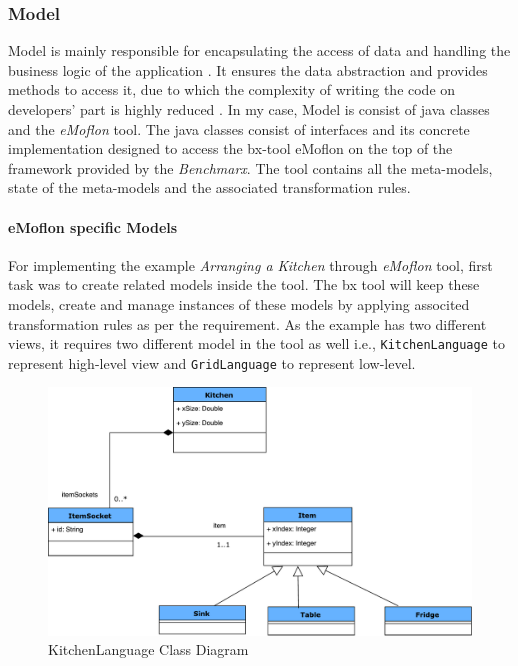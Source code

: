 \subsubsection{Model}\label{subsubsec:design_model}
Model is mainly responsible for encapsulating the access of data and handling the business logic of the application \cite{designpattern-headfirst} \cite{mvc-arch}. It ensures the data abstraction and provides methods to access it, due to which the complexity of writing the code on developers' part is highly reduced \cite{mdd-webwithmvc}.
\newline\newline In my case, Model is consist of java classes and the \textit{eMoflon} tool. The java classes consist of interfaces and its concrete implementation designed to access the bx-tool eMoflon on the top of the framework provided by the \textit{Benchmarx}. The tool contains all the meta-models, state of the meta-models and the associated transformation rules.

\paragraph{eMoflon specific Models}
For implementing the example \textit{Arranging a Kitchen} through \textit{eMoflon} tool, first task was to create related models inside the tool. The bx tool will keep these models, create and manage instances of these models by applying associted transformation rules as per the requirement. As the example has two different views, it requires two different model in the tool as well i.e., \texttt{KitchenLanguage} to represent high-level view and \texttt{GridLanguage} to represent low-level.

\begin{figure}
	\includegraphics[width=1\textwidth]{figures/ClassDia_KitchenLanguage}
	\caption{KitchenLanguage Class Diagram}
	\label{fig:ClassDia_KitchenLanguage}
\end{figure}

